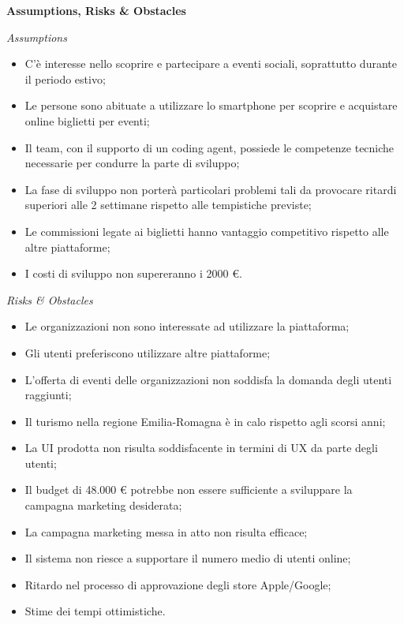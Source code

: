 \documentclass[11pt,a4paper]{article}
\providecommand{\tightlist}{\setlength{\itemsep}{0pt}\setlength{\parskip}{0pt}}
\begin{document}
\medskip\noindent\textbf{Assumptions, Risks \& Obstacles}\par\smallskip

\noindent\textit{Assumptions}\label{h.19u2v4tt25et}
\begin{itemize}
\tightlist
\item C’è interesse nello scoprire e partecipare a eventi sociali, soprattutto durante il periodo estivo;
\item Le persone sono abituate a utilizzare lo smartphone per scoprire e acquistare online biglietti per eventi;
\item Il team, con il supporto di un coding agent, possiede le competenze tecniche necessarie per condurre la parte di sviluppo;
\item La fase di sviluppo non porterà particolari problemi tali da provocare ritardi superiori alle 2 settimane rispetto alle tempistiche previste;
\item Le commissioni legate ai biglietti hanno vantaggio competitivo rispetto alle altre piattaforme;
\item I costi di sviluppo non supereranno i 2000 €.
\end{itemize}

\noindent\textit{Risks \& Obstacles}\label{h.vuh0x21nwkru}
\begin{itemize}
\tightlist
\item Le organizzazioni non sono interessate ad utilizzare la piattaforma;
\item Gli utenti preferiscono utilizzare altre piattaforme;
\item L’offerta di eventi delle organizzazioni non soddisfa la domanda degli utenti raggiunti;
\item Il turismo nella regione Emilia-Romagna è in calo rispetto agli scorsi anni;
\item La UI prodotta non risulta soddisfacente in termini di UX da parte degli utenti;
\item Il budget di 48.000 € potrebbe non essere sufficiente a sviluppare la campagna marketing desiderata;
\item La campagna marketing messa in atto non risulta efficace;
\item Il sistema non riesce a supportare il numero medio di utenti online;
\item Ritardo nel processo di approvazione degli store Apple/Google;
\item Stime dei tempi ottimistiche.
\end{itemize}
\end{document}
